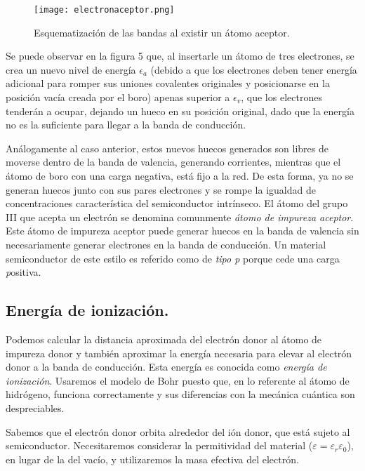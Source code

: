\documentclass[12pt,a4paper]{article}
\begin{document}
\begin{figure}[ht!]
\begin{center}
\texttt{[image: electronaceptor.png]}
\caption{Esquematización de las bandas al existir un átomo aceptor.}
\end{center}
\end{figure}

Se puede observar en la figura 5 que, al insertarle un átomo de tres electrones, se crea un nuevo nivel de energía $\epsilon _{a}$ (debido a que los electrones deben tener energía adicional para romper sus uniones covalentes originales y posicionarse en la posición vacía creada por el boro) apenas superior a $\epsilon _{v}$, que los electrones tenderán a ocupar, dejando un hueco en su posición original, dado que la energía no es la suficiente para llegar a la banda de conducción.

Análogamente al caso anterior, estos nuevos huecos generados son libres de moverse dentro de la banda de valencia, generando corrientes, mientras que el átomo de boro con una carga negativa, está fijo a la red. De esta forma, ya no se generan huecos junto con sus pares electrones y se rompe la igualdad de concentraciones característica del semiconductor intrínseco. El átomo del grupo III que acepta un electrón se denomina comunmente \emph{átomo de impureza aceptor}. Este átomo de impureza aceptor puede generar huecos en la banda de valencia sin necesariamente generar electrones en la banda de conducción. Un material semiconductor de este estilo es referido como de \emph{tipo p} porque cede una carga \emph{p}ositiva.

\subsection{Energía de ionización.}

Podemos calcular la distancia aproximada del electrón donor al átomo de impureza donor y también aproximar la energía necesaria para elevar al electrón donor a la banda de conducción. Esta energía es conocida como \emph{energía de ionización}. Usaremos el modelo de Bohr puesto que, en lo referente al átomo de hidrógeno, funciona correctamente y sus diferencias con la mecánica cuántica son despreciables.

Sabemos que el electrón donor orbita alrededor del ión donor, que está sujeto al semiconductor. Necesitaremos considerar la permitividad del material ($\varepsilon = \varepsilon _{r} \varepsilon _{0}$), en lugar de la del vacío, y utilizaremos la masa efectiva del electrón.
\end{document}
